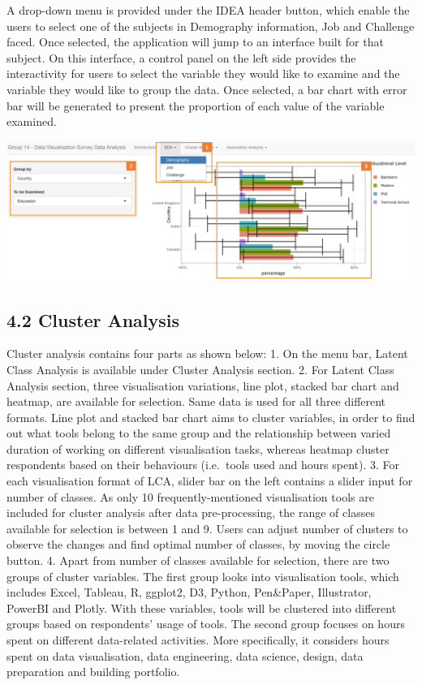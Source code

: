\documentclass{acm_proc_article-sp}
\begin{document}
A drop-down menu is provided under the IDEA header button, which enable
the users to select one of the subjects in Demography information, Job
and Challenge faced. Once selected, the application will jump to an
interface built for that subject. On this interface, a control panel on
the left side provides the interactivity for users to select the
variable they would like to examine and the variable they would like to
group the data. Once selected, a bar chart with error bar will be
generated to present the proportion of each value of the variable
examined.

\begin{center}\includegraphics[width=1\linewidth]{2} \end{center}

\hypertarget{cluster-analysis}{%
\subsection{4.2 Cluster Analysis}\label{cluster-analysis}}

Cluster analysis contains four parts as shown below: 1. On the menu bar,
Latent Class Analysis is available under Cluster Analysis section. 2.
For Latent Class Analysis section, three visualisation variations, line
plot, stacked bar chart and heatmap, are available for selection. Same
data is used for all three different formats. Line plot and stacked bar
chart aims to cluster variables, in order to find out what tools belong
to the same group and the relationship between varied duration of
working on different visualisation tasks, whereas heatmap cluster
respondents based on their behaviours (i.e.~tools used and hours spent).
3. For each visualisation format of LCA, slider bar on the left contains
a slider input for number of classes. As only 10 frequently-mentioned
visualisation tools are included for cluster analysis after data
pre-processing, the range of classes available for selection is between
1 and 9. Users can adjust number of clusters to observe the changes and
find optimal number of classes, by moving the circle button. 4. Apart
from number of classes available for selection, there are two groups of
cluster variables. The first group looks into visualisation tools, which
includes Excel, Tableau, R, ggplot2, D3, Python, Pen\&Paper,
Illustrator, PowerBI and Plotly. With these variables, tools will be
clustered into different groups based on respondents' usage of tools.
The second group focuses on hours spent on different data-related
activities. More specifically, it considers hours spent on data
visualisation, data engineering, data science, design, data preparation
and building portfolio.
\end{document}
